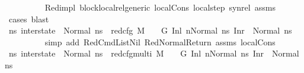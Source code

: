 \begin{isabellebody}
\ \ \ \ \ \ \ \ \isamarkupfalse%
\ Red{\isacharunderscore}{\kern0pt}impl\ block{\isacharunderscore}{\kern0pt}local{\isacharunderscore}{\kern0pt}rel{\isacharunderscore}{\kern0pt}generic\ local{\isachardot}{\kern0pt}Cons\ local{\isachardot}{\kern0pt}step\ syn{\isacharunderscore}{\kern0pt}rel\ assms\ \isamarkupfalse%
\ {\isacharparenleft}{\kern0pt}cases{\isacharparenright}{\kern0pt}\ blast{\isacharplus}{\kern0pt}\isanewline
\isanewline
\ \ \ \ \ \ \isamarkupfalse%
\ {\isachardoublequoteopen}{\isacharparenleft}{\kern0pt}{\isasymforall}ns{}{\isacharprime}{\kern0pt}{\isachardot}{\kern0pt}\ inter{\isacharunderscore}{\kern0pt}state\ {\isacharequal}{\kern0pt}\ Normal\ ns{}{\isacharprime}{\kern0pt}\ {\isasymlongrightarrow}\ red{\isacharunderscore}{\kern0pt}cfg\ M\ {\isasymLambda}\ {\isasymGamma}\ {\isasymOmega}\ G\ {\isacharparenleft}{\kern0pt}{\isacharparenleft}{\kern0pt}Inl\ n{\isacharparenright}{\kern0pt}{\isacharcomma}{\kern0pt}{\isacharparenleft}{\kern0pt}Normal\ ns{}{\isacharparenright}{\kern0pt}{\isacharparenright}{\kern0pt}\ {\isacharparenleft}{\kern0pt}Inr\ {\isacharparenleft}{\kern0pt}{\isacharparenright}{\kern0pt}{\isacharcomma}{\kern0pt}\ Normal\ ns{}{\isacharprime}{\kern0pt}{\isacharparenright}{\kern0pt}{\isacharparenright}{\kern0pt}{\isachardoublequoteclose}\isanewline
\ \ \ \ \ \ \ \ \isamarkupfalse%
\ {\isacharparenleft}{\kern0pt}simp\ add{\isacharcolon}{\kern0pt}\ RedCmdListNil\ RedNormalReturn\ assms{\isacharparenleft}{\kern0pt}{}{\isacharminus}{\kern0pt}{}{\isacharparenright}{\kern0pt}\ local{\isachardot}{\kern0pt}Cons{\isacharparenright}{\kern0pt}\isanewline
\isanewline
\ \ \ \ \ \ \isamarkupfalse%
\ {\isachardoublequoteopen}{\isacharparenleft}{\kern0pt}{\isasymforall}ns{}{\isacharprime}{\kern0pt}{\isachardot}{\kern0pt}\ inter{\isacharunderscore}{\kern0pt}state\ {\isacharequal}{\kern0pt}\ Normal\ ns{}{\isacharprime}{\kern0pt}\ {\isasymlongrightarrow}\ red{\isacharunderscore}{\kern0pt}cfg{\isacharunderscore}{\kern0pt}multi\ M\ {\isasymLambda}\ {\isasymGamma}\ {\isasymOmega}\ G\ {\isacharparenleft}{\kern0pt}{\isacharparenleft}{\kern0pt}Inl\ n{\isacharparenright}{\kern0pt}{\isacharcomma}{\kern0pt}{\isacharparenleft}{\kern0pt}Normal\ ns{}{\isacharparenright}{\kern0pt}{\isacharparenright}{\kern0pt}\ {\isacharparenleft}{\kern0pt}Inr\ {\isacharparenleft}{\kern0pt}{\isacharparenright}{\kern0pt}{\isacharcomma}{\kern0pt}\ Normal\ ns{}{\isacharprime}{\kern0pt}{\isacharparenright}{\kern0pt}{\isacharparenright}{\kern0pt}{\isachardoublequoteclose}\ \isanewline

\end{isabellebody}
